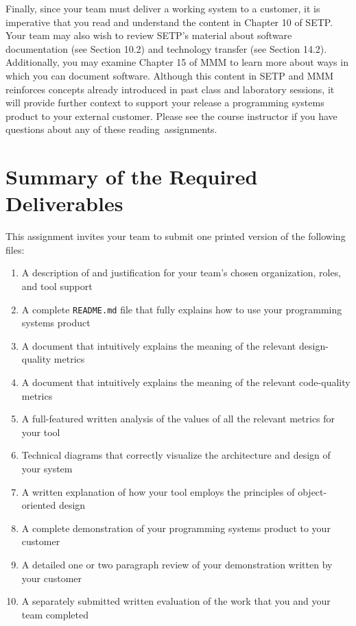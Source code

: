  Finally, since your team must deliver a working system to a customer, it is imperative that you read and understand the
 content in Chapter 10 of SETP. Your team may also wish to review SETP's material about software documentation (see
 Section 10.2) and technology transfer (see Section 14.2).  Additionally, you may examine Chapter 15 of MMM to learn
 more about ways in which you can document software. Although this content in SETP and MMM reinforces concepts already
 introduced in past class and laboratory sessions, it will provide further context to support your release a programming
 systems product to your external customer.  Please see the course instructor if you have questions about any of these
 \mbox{reading assignments}.

\section*{Summary of the Required Deliverables}

This assignment invites your team to submit one printed version of the following files:

\vspace*{-.1in}
\begin{enumerate}
  \itemsep0em
  \item A description of and justification for your team's chosen organization, roles, and tool support
  \item A complete {\tt README.md} file that fully explains how to use your programming systems product
  \item A document that intuitively explains the meaning of the relevant design-quality metrics
  \item A document that intuitively explains the meaning of the relevant code-quality metrics
  \item A full-featured written analysis of the values of all the relevant metrics for your tool
  \item Technical diagrams that correctly visualize the architecture and design of your system
  \item A written explanation of how your tool employs the principles of object-oriented design
  \item A complete demonstration of your programming systems product to your customer
  \item A detailed one or two paragraph review of your demonstration written by your customer
  \item A separately submitted written evaluation of the work that you and your team completed
\end{enumerate}
\vspace*{-.1in}


